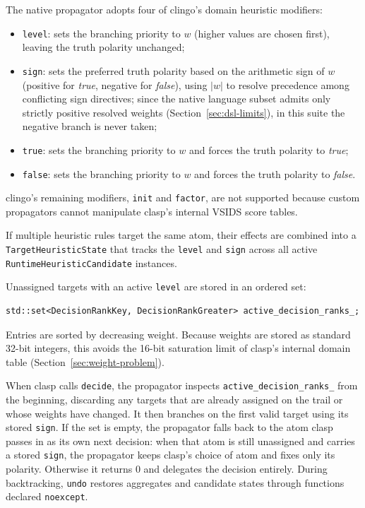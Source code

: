 The native propagator adopts four of clingo's domain heuristic modifiers:
\begin{itemize}
    \item \texttt{level}: sets the branching priority to $w$ (higher values are chosen first), leaving the truth polarity unchanged;
    \item \texttt{sign}: sets the preferred truth polarity based on the arithmetic sign of $w$ (positive for \textit{true}, negative for \textit{false}), using $|w|$ to resolve precedence among conflicting sign directives; since the native language subset admits only strictly positive resolved weights (Section~\ref{sec:dsl-limits}), in this suite the negative branch is never taken;
    \item \texttt{true}: sets the branching priority to $w$ and forces the truth polarity to \textit{true};
    \item \texttt{false}: sets the branching priority to $w$ and forces the truth polarity to \textit{false}.
\end{itemize}

clingo's remaining modifiers, \texttt{init} and \texttt{factor}, are not supported because custom propagators cannot manipulate clasp's internal VSIDS score tables.

If multiple heuristic rules target the same atom, their effects are combined into a \texttt{TargetHeuristicState} that tracks the \texttt{level} and \texttt{sign} across all active \texttt{RuntimeHeuristicCandidate} instances.

Unassigned targets with an active \texttt{level} are stored in an ordered set:

\begin{verbatim}
std::set<DecisionRankKey, DecisionRankGreater> active_decision_ranks_;
\end{verbatim}

Entries are sorted by decreasing weight. Because weights are stored as standard 32-bit integers, this avoids the 16-bit saturation limit of clasp's internal domain table (Section~\ref{sec:weight-problem}).

When clasp calls \texttt{decide}, the propagator inspects \texttt{active\_decision\_ranks\_} from the beginning, discarding any targets that are already assigned on the trail or whose weights have changed. It then branches on the first valid target using its stored \texttt{sign}. If the set is empty, the propagator falls back to the atom clasp passes in as its own next decision: when that atom is still unassigned and carries a stored \texttt{sign}, the propagator keeps clasp's choice of atom and fixes only its polarity. Otherwise it returns $0$ and delegates the decision entirely. During backtracking, \texttt{undo} restores aggregates and candidate states through functions declared \texttt{noexcept}.


